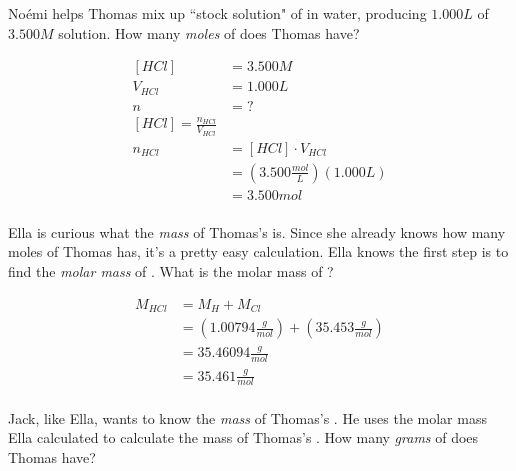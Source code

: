 \documentclass[11pt,addpoints]{exam}   	%
\begin{document}
\begin{questions}
\vspace{0.2in}


\question[5] No\'emi helps Thomas mix up ``stock solution" of  in water, producing $1.000 L$ of $3.500 M$  solution.
How many \emph{moles} of  does Thomas have?

\begin{solution}
\begin{equation} 
\begin{split}
    [HCl] &= 3.500 M \\
    V_{HCl} &= 1.000 L\\
    n &= ?\\
    [HCl] = \frac{n_{HCl}}{V_{HCl}} \\
    n_{HCl} &= [HCl] \cdot V_{HCl} \\
                 &= (3.500 \frac{mol}{L})(1.000 L) \\
                 &= 3.500 mol \\
 \end{split}
 \end{equation}
\end{solution}

\vspace{0.2in}


\question[5] Ella is curious what the \emph{mass} of Thomas's  is. Since she already knows how many moles of  Thomas has, it's a pretty easy calculation.
Ella knows the first step is to find the \emph{molar mass} of .
What is the molar mass of ?

\begin{solution}
\begin{equation} 
\begin{split}
    M_{HCl} &= M_{H} + M_{Cl} \\
                  &= (1.00794 \frac{g}{mol}) + (35.453 \frac{g}{mol}) \\
                  &= 35.46094 \frac{g}{mol} \\
                  &= 35.461 \frac{g}{mol} \\
 \end{split}
 \end{equation}
\end{solution}

\vspace{0.2in}

\question[5] Jack, like Ella, wants to know the \emph{mass} of Thomas's . He uses the molar mass Ella calculated to calculate the mass of Thomas's .
How many \emph{grams} of  does Thomas have?


\end{questions}
\end{document}
